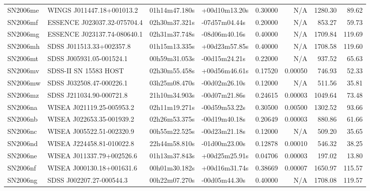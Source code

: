 \begin{longtable}{llllrrrr}
SN2006me         &       WINGS J011447.18+001013.2 &   01h14m47.180s &   +00d10m13.20s &  0.30000 &      N/A &  1280.30 &       89.62 \\
SN2006mf         &     ESSENCE J023037.32-075704.4 &   02h30m37.321s &   -07d57m04.44s &  0.20000 &      N/A &   853.27 &       59.73 \\
SN2006mg         &     ESSENCE J023137.74-080640.1 &   02h31m37.748s &   -08d06m40.16s &  0.40000 &      N/A &  1709.84 &      119.69 \\
SN2006mh         &        SDSS J011513.33+002357.8 &   01h15m13.335s &   +00d23m57.85s &  0.40000 &      N/A &  1708.58 &      119.60 \\
SN2006mt         &        SDSS J005931.05-001524.1 &   00h59m31.053s &   -00d15m24.21s &  0.22000 &      N/A &   937.52 &       65.63 \\
SN2006mv         &           SDSS-II SN 15583 HOST &   02h30m55.458s &   +00d56m46.61s &  0.17520 &  0.00050 &   746.93 &       52.33 \\
SN2006mw         &        SDSS J032508.47-000226.1 &   03h25m08.470s &   -00d02m26.10s &  0.12000 &      N/A &   511.56 &       35.81 \\
SN2006mz         &        SDSS J211034.90-000721.8 &   21h10m34.903s &   -00d07m21.86s &  0.24615 &  0.00003 &  1049.64 &       73.48 \\
SN2006na         &       WISEA J021119.25-005953.2 &   02h11m19.271s &   -00d59m53.22s &  0.30500 &  0.00500 &  1302.52 &       93.66 \\
SN2006nb         &       WISEA J022653.35-001939.2 &   02h26m53.375s &   -00d19m40.18s &  0.20649 &  0.00003 &   880.86 &       61.66 \\
SN2006nc         &       WISEA J005522.51-002320.9 &   00h55m22.525s &   -00d23m21.18s &  0.12000 &      N/A &   509.20 &       35.65 \\
SN2006nd         &       WISEA J224458.81-010022.8 &   22h44m58.810s &   -01d00m23.00s &  0.12878 &  0.00010 &   546.32 &       38.25 \\
SN2006ne         &       WISEA J011337.79+002526.6 &   01h13m37.843s &   +00d25m25.91s &  0.04706 &  0.00003 &   197.02 &       13.80 \\
SN2006nf         &       WISEA J000130.18+001631.6 &   00h01m30.182s &   +00d16m31.74s &  0.38669 &  0.00007 &  1650.97 &      115.57 \\
SN2006ng         &        SDSS J002207.27-000544.3 &   00h22m07.270s &   -00d05m44.30s &  0.40000 &      N/A &  1708.08 &      119.57 \\

\end{longtable}
